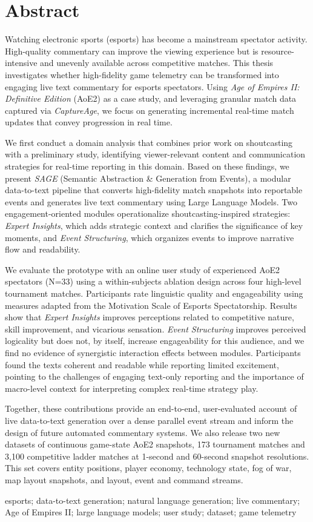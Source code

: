 \chapter*{Abstract}

Watching electronic sports (esports) has become a mainstream spectator activity. High-quality commentary can improve the viewing experience but is resource-intensive and unevenly available across competitive matches. This thesis investigates whether high-fidelity game telemetry can be transformed into engaging live text commentary for esports spectators. Using \textit{Age of Empires II: Definitive Edition} (AoE2) as a case study, and leveraging granular match data captured via \textit{CaptureAge}, we focus on generating incremental real-time match updates that convey progression in real time.

We first conduct a domain analysis that combines prior work on shoutcasting with a preliminary study, identifying viewer-relevant content and communication strategies for real-time reporting in this domain. Based on these findings, we present \textit{SAGE} (Semantic Abstraction \& Generation from Events), a modular data-to-text pipeline that converts high-fidelity match snapshots into reportable events and generates live text commentary using Large Language Models. Two engagement-oriented modules operationalize shoutcasting-inspired strategies: \textit{Expert Insights}, which adds strategic context and clarifies the significance of key moments, and \textit{Event Structuring}, which organizes events to improve narrative flow and readability.

We evaluate the prototype with an online user study of experienced AoE2 spectators (N=33) using a within-subjects ablation design across four high-level tournament matches. Participants rate linguistic quality and engageability using measures adapted from the Motivation Scale of Esports Spectatorship. Results show that \textit{Expert Insights} improves perceptions related to competitive nature, skill improvement, and vicarious sensation. \textit{Event Structuring} improves perceived logicality but does not, by itself, increase engageability for this audience, and we find no evidence of synergistic interaction effects between modules. Participants found the texts coherent and readable while reporting limited excitement, pointing to the challenges of engaging text-only reporting and the importance of macro-level context for interpreting complex real-time strategy play.

Together, these contributions provide an end-to-end, user-evaluated account of live data-to-text generation over a dense parallel event stream and inform the design of future automated commentary systems. We also release two new datasets of continuous game-state AoE2 snapshots, 173 tournament matches and 3,100 competitive ladder matches at 1-second and 60-second snapshot resolutions. This set covers entity positions, player economy, technology state, fog of war, map layout snapshots, and layout, event and command streams.

\vfill
\begin{keywords}
  esports; data-to-text generation; natural language generation; live commentary; Age of Empires II; large language models; user study; dataset; game telemetry
\end{keywords}
